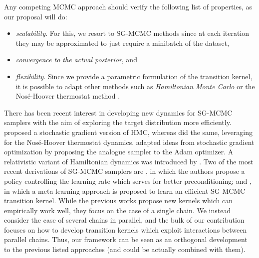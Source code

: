 Any competing MCMC approach should verify the following list of properties, as our proposal will do:
\begin{itemize}
    \item \emph{scalability}. For this, we resort to SG-MCMC methods since at each iteration they may be approximated to just require a minibatch of the dataset,
    \item \emph{convergence to the actual posterior}, and
    \item \emph{flexibility}. Since we provide a parametric formulation of the transition kernel, it is possible to adapt other methods such as \emph{Hamiltonian Monte Carlo} \parencite{neal2011mcmc} or the Nos\'e-Hoover thermostat method \parencite{ding2014bayesian}.
\end{itemize}
There has been recent interest in developing new dynamics for SG-MCMC samplers with the aim of exploring the target distribution more efficiently. \cite{chen2014stochastic} proposed a stochastic gradient version of HMC, whereas \cite{ding2014bayesian} did the same, leveraging for the Nos\'e-Hoover thermostat dynamics. \cite{chen2016bridging} adapted ideas from stochastic gradient optimization by proposing the analogue sampler to the Adam optimizer. A relativistic variant of Hamiltonian dynamics was introduced by \cite{abbati2018adageo}. Two of the most recent derivations of SG-MCMC samplers are \parencite{zhang2019cyclical}, in which the authors propose a policy controlling the learning rate which serves for better preconditioning; and \parencite{gong2019meta}, in which a meta-learning approach is proposed to learn an efficient SG-MCMC transition kernel.
While the previous works propose new kernels which can empirically work well, they focus on the case of a single chain. We instead consider the case of several chains in parallel, and the bulk of our contribution focuses on how to develop transition kernels which exploit interactions between parallel chains. Thus, our framework can be seen as an orthogonal development to the previous listed approaches (and could be actually combined with them).


